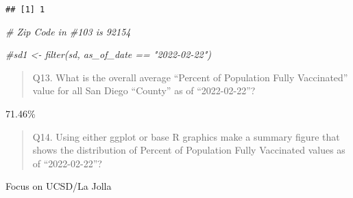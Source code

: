 \documentclass[
]{article}
\newenvironment{Shaded}{\begin{snugshade}}{\end{snugshade}}
\newcommand{\CommentTok}[1]{\textcolor[rgb]{0.56,0.35,0.01}{\textit{#1}}}
\begin{document}
\begin{verbatim}
## [1] 1
\end{verbatim}

\begin{Shaded}
\begin{Highlighting}[]
\CommentTok{\# Zip Code in \#103 is 92154}
\end{Highlighting}
\end{Shaded}

\begin{Shaded}
\begin{Highlighting}[]
\CommentTok{\#sd1 \textless{}{-} filter(sd, as\_of\_date == "2022{-}02{-}22")}
\end{Highlighting}
\end{Shaded}

\begin{quote}
Q13. What is the overall average ``Percent of Population Fully
Vaccinated'' value for all San Diego ``County'' as of ``2022-02-22''?
\end{quote}

\begin{Shaded}
\end{Shaded}

71.46\%

\begin{quote}
Q14. Using either ggplot or base R graphics make a summary figure that
shows the distribution of Percent of Population Fully Vaccinated values
as of ``2022-02-22''?
\end{quote}

\begin{Shaded}
\end{Shaded}

Focus on UCSD/La Jolla

\begin{Shaded}
\end{Shaded}
\end{document}
